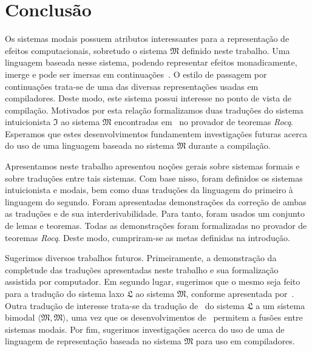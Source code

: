 \chapter{Conclusão}
    Os sistemas modais possuem atributos interessantes para a representação de efeitos computacionais, sobretudo o sistema $\mathfrak{M}$ definido neste trabalho.
    Uma linguagem baseada nesse sistema, podendo representar efeitos monadicamente, imerge e pode ser imersas em continuações~\citep{Filinski.1994}.
    O estilo de passagem por continuações trata-se de uma das diversas representações usadas em compiladores.
    Deste modo, este sistema possui interesse no ponto de vista de compilação.
    Motivados por esta relação formalizamos duas traduções do sistema intuicionista $\mathfrak{I}$ ao sistema $\mathfrak{M}$ encontradas em~\cite{Troelstra+Schwichtenberg.2000} no provador de teoremas \emph{Rocq}.
    Esperamos que estes desenvolvimentos fundamentem investigações futuras acerca do uso de uma linguagem baseada no sistema $\mathfrak{M}$ durante a compilação.

    \vspace{.5\baselineskip}
    Apresentamos neste trabalho apresentou noções gerais sobre sistemas formais e sobre traduções entre tais sistemas.
    Com base nisso, foram definidos os sistemas intuicionista e modais, bem como duas traduções da linguagem do primeiro à linguagem do segundo.
    Foram apresentadas demonstrações da correção de ambas as traduções e de sua interderivabilidade.
    Para tanto, foram usados um conjunto de lemas e teoremas.
    Todas as demonstrações foram formalizadas no provador de teoremas \emph{Rocq}.
    Deste modo, cumpriram-se as metas definidas na introdução.

    \vspace{.5\baselineskip}
    Sugerimos diversos trabalhos futuros. Primeiramente, a demonstração da completude das traduções apresentadas neste trabalho e sua formalização assistida por computador.
    Em segundo lugar, sugerimos que o mesmo seja feito para a tradução do sistema laxo $\mathfrak{L}$ ao sistema $\mathfrak{M}$, conforme apresentada por~\cite{Pfenning+Davies.2001}. 
    Outra tradução de interesse trata-se da tradução de~\cite{Fairtlough+Mendler.1997} do sistema $\mathfrak{L}$ a um sistema bimodal $\langle\mathfrak{M},\mathfrak{M}\rangle$, uma vez que os desenvolvimentos de~\cite{Nunes+Roggia+Torrens.2025} permitem a fusões entre sistemas modais.
    Por fim, sugerimos investigações acerca do uso de uma de linguagem de representação baseada no sistema $\mathfrak{M}$ para uso em compiladores.

